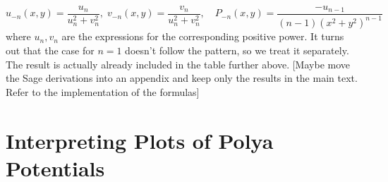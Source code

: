 \documentclass[12pt]{article}
\begin{document}
\begin{equation}
\label{Eq:PolyaFieldNegativePowers}
\boxed
{		
u_{-n}(x,y) = \frac{u_n}{u_n^2 + v_n^2} ,\;
v_{-n}(x,y) = \frac{v_n}{u_n^2 + v_n^2} ,\quad
P_{-n}(x,y) = \frac{-u_{n-1}}{(n-1)(x^2+y^2)^{n-1}}
}
\end{equation}
where $u_n, v_n$ are the expressions for the corresponding positive power. It turns out that the case for $n=1$ doesn't follow the pattern, so we treat it separately. The result is actually already included in the table further above. [Maybe move the Sage derivations into an appendix and keep only the results in the main text. Refer to the implementation of the formulas]

\section{Interpreting Plots of Polya Potentials}
\end{document}
